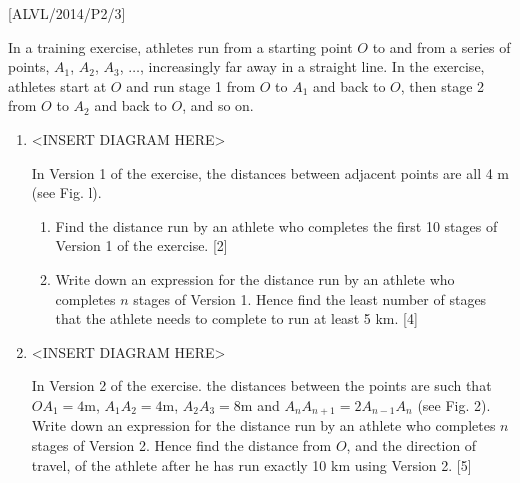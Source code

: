 \item {[}ALVL/2014/P2/3{]}

In a training exercise, athletes run from a starting point $O$ to
and from a series of points, $A_{1}$, $A_{2}$, $A_{3}$, $\dots$,
increasingly far away in a straight line. In the exercise, athletes
start at $O$ and run stage 1 from $O$ to $A_{1}$ and back to $O$,
then stage 2 from $O$ to $A_{2}$ and back to $O$, and so on. 
\begin{enumerate}
\item {}
\noindent \begin{center}
<INSERT DIAGRAM HERE>
\par\end{center}

In Version 1 of the exercise, the distances between adjacent points
are all 4 m (see Fig. l). 
\begin{enumerate}
\item Find the distance run by an athlete who completes the first 10 stages
of Version 1 of the exercise.\hfill{} {[}2{]}
\item Write down an expression for the distance run by an athlete who completes
$n$ stages of Version 1. Hence find the least number of stages that
the athlete needs to complete to run at least 5 km.\hfill{} {[}4{]}
\end{enumerate}
\item {}
\noindent \begin{center}
<INSERT DIAGRAM HERE>
\par\end{center}

In Version 2 of the exercise. the distances between the points are
such that $OA_{1}=4\text{m}$, $A_{1}A_{2}=4\text{m}$, $A_{2}A_{3}=8\text{m}$
and $A_{n}A_{n+1}=2A_{n-1}A_{n}$ (see Fig. 2). Write down an expression
for the distance run by an athlete who completes $n$ stages of Version
2. Hence find the distance from $O$, and the direction of travel,
of the athlete after he has run exactly 10 km using Version 2.\hfill{}
{[}5{]}
\end{enumerate}
